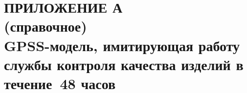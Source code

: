 \renewcommand{\thefigure}{\Asbuk{section}.\arabic{figure}}
\renewcommand{\thetable}{\Asbuk{section}.\arabic{table}}
\renewcommand{\thelstlisting}{\Asbuk{section}.\arabic{lstlisting}}

\pagestyle{fancy}
\fancyhf{} %
\fancyfoot[R]{\thepage}
\renewcommand{\headrulewidth}{0pt}
\renewcommand{\footrulewidth}{0pt}

\setlength{\headheight}{10mm}
\setlength{\headsep}{\baselineskip}

\section*{ПРИЛОЖЕНИЕ А\\(справочное)\\GPSS-модель, имитирующая работу \\ службы контроля качества изделий в течение~48 часов}

\thispagestyle{plain}
\setcounter{section}{1}
\setcounter{figure}{0}
\setcounter{table}{0}
\setcounter{lstlisting}{0}


